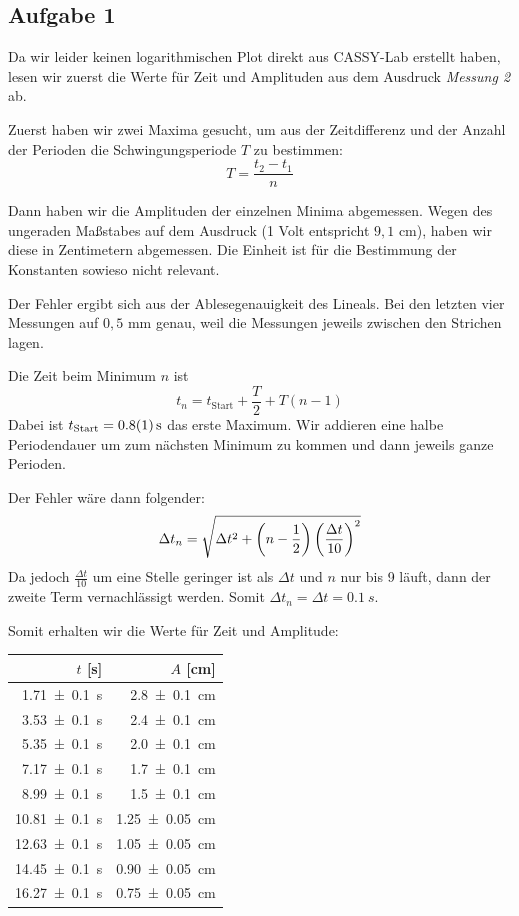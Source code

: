 \documentclass[a4paper,german,12pt,smallheadings]{scrartcl}
\begin{document}
\subsection{Aufgabe 1}
Da wir leider keinen logarithmischen Plot direkt aus CASSY-Lab erstellt haben,
lesen wir zuerst die Werte für Zeit und Amplituden aus dem Ausdruck
\textit{Messung 2} ab.

Zuerst haben wir zwei Maxima gesucht, um aus der Zeitdifferenz und der Anzahl
der Perioden die Schwingungsperiode $T$ zu bestimmen:
\begin{equation}
  T = \frac{t_2 - t_1}{n}
\end{equation}

Dann haben wir die Amplituden der einzelnen Minima abgemessen.  Wegen des
ungeraden Maßstabes auf dem Ausdruck (1 Volt entspricht $9{,}1$ cm), haben wir
diese in Zentimetern abgemessen. Die Einheit ist für die Bestimmung der
Konstanten sowieso nicht relevant.

Der Fehler ergibt sich aus der Ablesegenauigkeit des Lineals. Bei den letzten
vier Messungen auf $0{,}5$ mm genau, weil die Messungen jeweils zwischen
den Strichen lagen.

Die Zeit beim Minimum $n$ ist
\begin{equation}
  t_n = t_\text{Start} + \frac{T}{2} + T(n-1)
\end{equation}
Dabei ist $t_\text{Start} = \SI{0.8+-0.1}{s}$ das erste Maximum. Wir addieren
eine halbe Periodendauer um zum nächsten Minimum zu kommen und dann jeweils
ganze Perioden.

Der Fehler wäre dann folgender:
\begin{equation}
  \Delta t_n = \sqrt{\Delta t^2 + \del{n- \frac{1}{2}} \del{\frac{\Delta t}{10}}^2}
\end{equation}
Da jedoch $\frac{\Delta t}{10}$ um eine Stelle geringer ist als $\Delta t$ und
$n$ nur bis 9 läuft, dann der zweite Term vernachlässigt werden. Somit
$\Delta t_n = \Delta t = \SI{0.1}{s}$.

Somit erhalten wir die Werte für Zeit und Amplitude:

\begin{tabular}{r|r}
  $t$ [s] & $A$ [cm] \\
  \hline
  \SI{ 1.71+-0.1}{s} & \SI{ 2.8+-0.1 }{cm} \\
  \SI{ 3.53+-0.1}{s} & \SI{ 2.4+-0.1 }{cm} \\
  \SI{ 5.35+-0.1}{s} & \SI{ 2,0+-0.1 }{cm} \\
  \SI{ 7.17+-0.1}{s} & \SI{ 1.7+-0.1 }{cm} \\
  \SI{ 8.99+-0.1}{s} & \SI{ 1.5+-0.1 }{cm} \\
  \SI{10.81+-0.1}{s} & \SI{1.25+-0.05}{cm} \\
  \SI{12.63+-0.1}{s} & \SI{1.05+-0.05}{cm} \\
  \SI{14.45+-0.1}{s} & \SI{0.90+-0.05}{cm} \\
  \SI{16.27+-0.1}{s} & \SI{0.75+-0.05}{cm} \\
\end{tabular}
\end{document}
